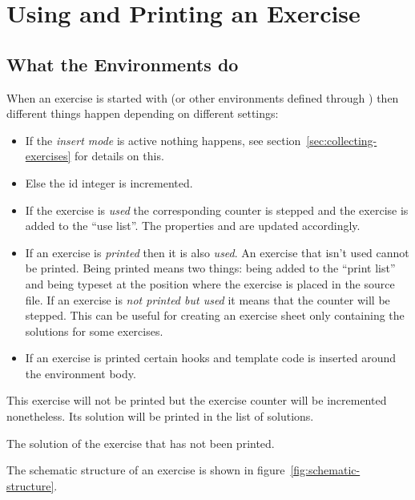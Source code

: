 \documentclass{xsim-manual}
\begin{document}
\section{Using and Printing an Exercise}\label{sec:using-printing}
\subsection{What the Environments do}

When an exercise is started with  (or other environments
defined through ) then different things happen
depending on different settings:
\begin{itemize}
  \item If the \emph{insert mode} is active nothing happens, see
    section~\vref{sec:collecting-exercises} for details on this.
  \item Else the id integer is incremented.
  \item If the exercise is \emph{used} the corresponding counter is stepped
    and the exercise is added to the \enquote{use list}.  The properties
     and  are updated accordingly.
  \item If an exercise is \emph{printed} then it is also \emph{used}. An
    exercise that isn't used cannot be printed.  Being printed means two
    things: being added to the \enquote{print list} and being typeset at the
    position where the exercise is placed in the source file.  If an exercise
    is \emph{not printed but used} it means that the counter will be stepped.
    This can be useful for creating an exercise sheet only containing the
    solutions for some exercises.
  \item If an exercise is printed certain hooks and template code is inserted
    around the environment body.
\end{itemize}

\begin{example}
  \begin{exercise}[print=false]
    This exercise will not be printed but the exercise counter will be
    incremented nonetheless. Its solution will be printed in the list of
    solutions.
  \end{exercise}
  \begin{solution}
    The solution of the exercise that has not been printed.
  \end{solution}
\end{example}

The schematic structure of an exercise is shown in
figure~\vref{fig:schematic-structure}.
\end{document}
